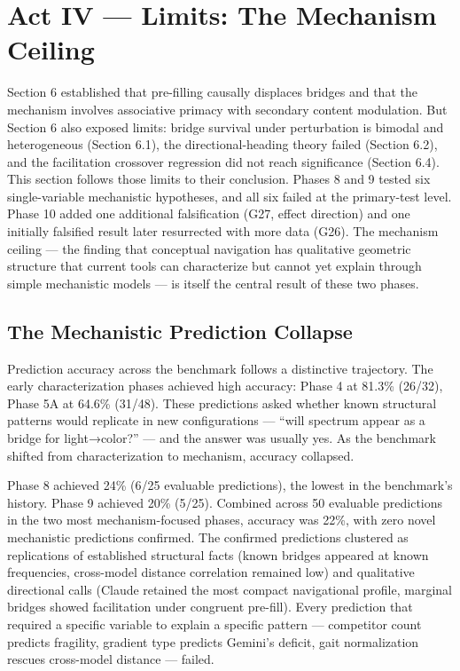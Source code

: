 \section{Act IV --- Limits: The Mechanism Ceiling}\label{act-iv-limits-the-mechanism-ceiling}

Section 6 established that pre-filling causally displaces bridges and that the mechanism involves associative primacy with secondary content modulation. But Section 6 also exposed limits: bridge survival under perturbation is bimodal and heterogeneous (Section 6.1), the directional-heading theory failed (Section 6.2), and the facilitation crossover regression did not reach significance (Section 6.4). This section follows those limits to their conclusion. Phases 8 and 9 tested six single-variable mechanistic hypotheses, and all six failed at the primary-test level. Phase 10 added one additional falsification (G27, effect direction) and one initially falsified result later resurrected with more data (G26). The mechanism ceiling --- the finding that conceptual navigation has qualitative geometric structure that current tools can characterize but cannot yet explain through simple mechanistic models --- is itself the central result of these two phases.

\subsection{The Mechanistic Prediction Collapse}\label{the-mechanistic-prediction-collapse}

Prediction accuracy across the benchmark follows a distinctive trajectory. The early characterization phases achieved high accuracy: Phase 4 at 81.3\% (26/32), Phase 5A at 64.6\% (31/48). These predictions asked whether known structural patterns would replicate in new configurations --- ``will spectrum appear as a bridge for light→color?'' --- and the answer was usually yes. As the benchmark shifted from characterization to mechanism, accuracy collapsed.

Phase 8 achieved 24\% (6/25 evaluable predictions), the lowest in the benchmark's history. Phase 9 achieved 20\% (5/25). Combined across 50 evaluable predictions in the two most mechanism-focused phases, accuracy was 22\%, with zero novel mechanistic predictions confirmed. The confirmed predictions clustered as replications of established structural facts (known bridges appeared at known frequencies, cross-model distance correlation remained low) and qualitative directional calls (Claude retained the most compact navigational profile, marginal bridges showed facilitation under congruent pre-fill). Every prediction that required a specific variable to explain a specific pattern --- competitor count predicts fragility, gradient type predicts Gemini's deficit, gait normalization rescues cross-model distance --- failed.

